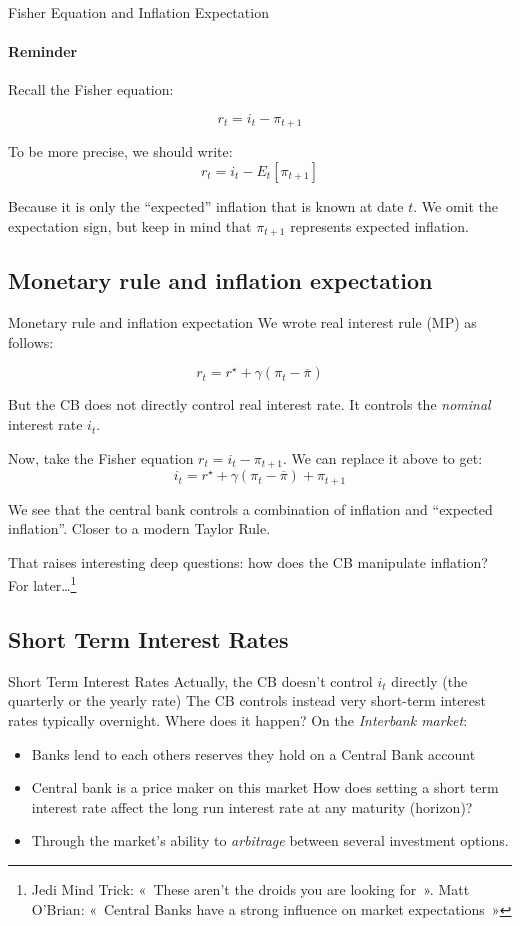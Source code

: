 \documentclass[
  ignorenonframetext,
  aspectratio=169,
]{beamer}
\providecommand{\tightlist}{%
  \setlength{\itemsep}{0pt}\setlength{\parskip}{0pt}}\usepackage{longtable,booktabs,array}
\begin{document}
\begin{frame}{Fisher Equation and Inflation Expectation}
\framesubtitle{Reminder}

Recall the Fisher equation:

\[r_t = i_t - \pi_{t+1}\]

To be more precise, we should write: \[r_t = i_t - E_t [\pi_{t+1}]\]

Because it is only the ``expected'' inflation that is known at date
\(t\). We omit the expectation sign, but keep in mind that \(\pi_{t+1}\)
represents expected inflation.
\end{frame}

\subsection{Monetary rule and inflation
expectation}\label{monetary-rule-and-inflation-expectation}

\begin{frame}{Monetary rule and inflation expectation}
We wrote real interest rule (MP) as follows:

\[r_t = r^ {\star} + \gamma (\pi_t - \overline{\pi})\]

But the CB does not directly control real interest rate. It controls the
\emph{nominal} interest rate \(i_t\).

Now, take the Fisher equation \(r_t = i_t - \pi_{t+1}\). We can replace
it above to get:
\[i_t = r^{\star} + \gamma (\pi_t - \overline{\pi}) + \pi_{t+1}\]

We see that the central bank controls a combination of inflation and
``expected inflation''. Closer to a modern Taylor Rule.

That raises interesting deep questions: how does the CB manipulate
inflation? For
later\ldots{}\footnote{Jedi Mind Trick: « These aren’t the droids you are looking for ». Matt O’Brian:  « Central Banks have a strong influence on market expectations »}
\end{frame}

\subsection{Short Term Interest Rates}\label{short-term-interest-rates}

\begin{frame}{Short Term Interest Rates}
Actually, the CB doesn't control \(i_t\) directly (the quarterly or the
yearly rate) The CB controls instead very short-term interest rates
typically overnight. Where does it happen? On the \emph{Interbank
market}:

\begin{itemize}
\tightlist
\item
  Banks lend to each others reserves they hold on a Central Bank account
\item
  Central bank is a price maker on this market How does setting a short
  term interest rate affect the long run interest rate at any maturity
  (horizon)?
\item
  Through the market's ability to \emph{arbitrage} between several
  investment options.
\end{itemize}
\end{frame}
\end{document}
